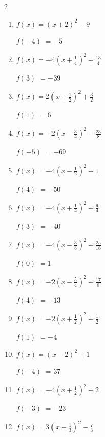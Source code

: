 \begin{multicols}{2}
\begin{enumerate}
$f(5)$
        $=-31$

  \item $\displaystyle f(x)=\left( x+2\right)^{2}-9$

$f(-4)$
        $=-5$

  \item $\displaystyle f(x)=-4\left( x+\frac{1}{4}\right)^{2}+\frac{13}{4}$

$f(3)$
        $=-39$

\columnbreak %

\resetques

  \item $\displaystyle f(x)=2\left( x+\frac{1}{2}\right)^{2}+\frac{3}{2}$

$f(1)$
        $=6$

  \item $\displaystyle f(x)=-2\left( x-\frac{3}{4}\right)^{2}-\frac{23}{8}$

$f(-5)$
        $=-69$

  \item $\displaystyle f(x)=-4\left( x-\frac{1}{2}\right)^{2}-1$

$f(4)$
        $=-50$

  \item $\displaystyle f(x)=-4\left( x+\frac{1}{4}\right)^{2}+\frac{9}{4}$

$f(3)$
        $=-40$

  \item $\displaystyle f(x)=-4\left( x-\frac{3}{8}\right)^{2}+\frac{25}{16}$

$f(0)$
        $=1$

\columnbreak %

  \item $\displaystyle f(x)=-2\left( x-\frac{5}{4}\right)^{2}+\frac{17}{8}$

$f(4)$
        $=-13$

  \item $\displaystyle f(x)=-2\left( x+\frac{1}{2}\right)^{2}+\frac{1}{2}$

$f(1)$
        $=-4$

  \item $\displaystyle f(x)=\left( x-2\right)^{2}+1$

$f(-4)$
        $=37$

  \item $\displaystyle f(x)=-4\left( x+\frac{1}{2}\right)^{2}+2$

$f(-3)$
        $=-23$

  \item $\displaystyle f(x)=3\left( x-\frac{1}{3}\right)^{2}-\frac{7}{3}$


\end{enumerate}
\end{multicols}
